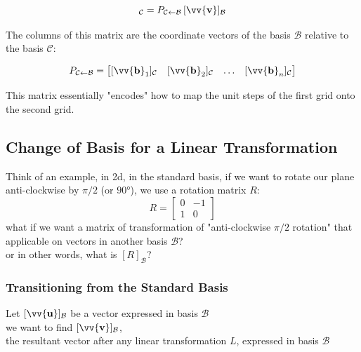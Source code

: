 \documentclass[11pt]{article}
\DeclareRobustCommand{\myvec}[1]{\vv{\mathbf{#1}}}
\newcommand{\myset}[1]{\mathcal{#1}}
\newcommand{\mymat}[1]{#1}
\begin{document}
    \begin{equation}
        [\myvec{v}]_{\myset{C}} = \mymat{P}_{\myset{C} \leftarrow \myset{B}}\,[\myvec{v}]_{\myset{B}}
    \end{equation}

    The columns of this matrix are the coordinate vectors of the basis $\myset{B}$ relative to the basis $\myset{C}$:

    \begin{equation}
        \mymat{P}_{\myset{C} \leftarrow \myset{B}} = 
        \begin{bmatrix} 
            [\myvec{b}_1]_{\myset{C}} & [\myvec{b}_2]_{\myset{C}} & \dots & [\myvec{b}_n]_{\myset{C}} 
        \end{bmatrix}
    \end{equation}

    This matrix essentially "encodes" how to map the unit steps of the first grid onto the second grid.

    \newpage
    \subsection{Change of Basis for a Linear Transformation}
    
    Think of an example, in 2d, in the standard basis, if we want to rotate our plane anti-clockwise by $\pi/2$ (or $\ang{90}$), we use a rotation matrix $\mymat{R}$:
    \[ \mymat{R} = \begin{bmatrix}
        0 & -1 \\
        1 & 0
    \end{bmatrix} \]
    what if we want a matrix of transformation of "anti-clockwise $\pi/2$ rotation" that applicable on vectors in another basis $\myset{B}$?\\
    or in other words, what is $[\mymat{R}]_\myset{B}$?
    \vspace{\belowdisplayskip}

    \subsubsection{Transitioning from the Standard Basis}

    Let $[\myvec{u}]_{\myset{B}}$ be a vector expressed in basis $\myset{B}$\\
    we want to find $[\myvec{v}]_{\myset{B}}$, \\
    \quad the resultant vector after any linear transformation $\mymat{L}$, expressed in basis $\myset{B}$ \vspace{\belowdisplayshortskip}
\end{document}
